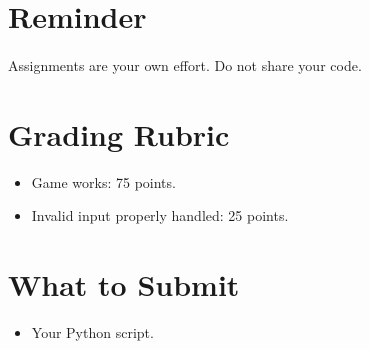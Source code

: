\documentclass[letter,10pt]{article}
\begin{document}
    \section*{Reminder}
    \paragraph{}Assignments are your own effort. Do not share your code.
    
    \section*{Grading Rubric}
    \begin{itemize}
        \item Game works: 75 points.
        \item Invalid input properly handled: 25 points.
    \end{itemize}
    
    \section*{What to Submit}
    \begin{itemize}
        \item Your Python script.
    \end{itemize}
    
\end{document}
